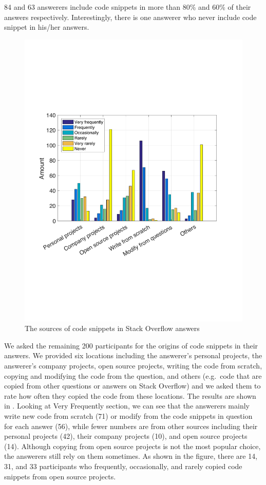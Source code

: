 \documentclass[10pt,journal,compsoc]{IEEEtran}
\begin{document}
84 and 63 answerers include code snippets in more than 80\% and 60\% of
their answers respectively. Interestingly, there is one answerer who never
include code snippet in his/her answers.

\begin{figure}
	\centering
	\includegraphics[width=0.9\linewidth]{survey_snippet_source}
	\caption{The sources of code snippets in Stack Overflow answers}
	\label{fig:survey_snippet_source}
\end{figure}

We asked the remaining 200 participants for the origins of code snippets in
their answers. We provided six locations including the answerer's personal
projects, the answerer's company projects, open source projects, writing the
code from scratch, copying and modifying the code from the question, and others
(e.g.~code that are copied from other questions or answers on Stack Overflow)
and we asked them to rate how often they copied the code from these locations. The
results are shown in . Looking at Very
Frequently section, we can see that the answerers mainly write new code from
scratch (71) or modify from the code snippets in question for each answer (56),
while fewer numbers are from other sources including their personal projects
(42), their company projects (10), and open source projects (14). Although
copying from open source projects is not the most popular choice, the answerers
still rely on them sometimes. As shown in the figure, there are 14, 31, and 33
participants who frequently, occasionally, and rarely copied code snippets from
open source projects.
\end{document}
